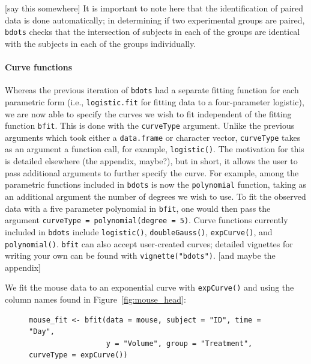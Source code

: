 \documentclass{article}
\newcommand{\xt}{\texttt}%
\begin{document}
[say this somewhere] It is important to note here that the identification of paired data is done automatically; in determining if two experimental groups are paired, \xt{bdots} checks that the intersection of subjects in each of the groups are identical with the subjects in each of the groups individually.


\paragraph{Curve functions} Whereas the previous iteration of \xt{bdots} had a separate fitting function for each parametric form (i.e., \xt{logistic.fit} for fitting data to a four-parameter logistic), we are now able to specify the curves we wish to fit independent of the fitting function \xt{bfit}. This is done with the \xt{curveType} argument. Unlike the previous arguments which took either a \xt{data.frame} or character  vector, \xt{curveType} takes as an argument a function call, for example, \xt{logistic()}. The motivation for this is detailed elsewhere (the appendix, maybe?), but in short, it allows the user to pass additional arguments to further specify the curve. For example, among the parametric functions included in \xt{bdots} is now the \xt{polynomial} function, taking as an additional argument the number of degrees we wish to use. To fit the observed data with a five parameter polynomial in \xt{bfit}, one would then pass the argument \xt{curveType = polynomial(degree = 5)}. Curve functions currently included in \xt{bdots} include \xt{logistic()}, \xt{doubleGauss()}, \xt{expCurve()}, and \xt{polynomial()}. \xt{bfit} can also accept user-created curves; detailed vignettes for writing your own can be found with \xt{vignette("bdots")}. [and maybe the appendix]

We fit the mouse data to an exponential curve with \xt{expCurve()} and using the column names found in Figure~\ref{fig:mouse_head}:

\begin{singlespace}
\begin{figure}[H]
\centering
\begin{BVerbatim}
mouse_fit <- bfit(data = mouse, subject = "ID", time = "Day", 
                  y = "Volume", group = "Treatment", curveType = expCurve())
\end{BVerbatim}
\label{fig:bfit_example}
\end{figure}
\end{singlespace}
\end{document}
